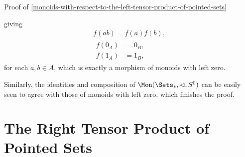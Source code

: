 \begin{Proof}{Proof of \cref{monoids-with-respect-to-the-left-tensor-product-of-pointed-sets}}
\begin{webcompile}
    \end{webcompile}
    giving
    \begin{gather*}
        f(ab)    = f(a)f(b),\\
        \begin{aligned}
            f(0_{A}) &= 0_{B},\\
            f(1_{A}) &= 1_{B},
        \end{aligned}
    \end{gather*}
    for each $a,b\in A$, which is exactly a morphism of monoids with left zero.

    Similarly, the identities and composition of $\Mon(\Sets_{*},\lhd,S^{0})$ can be easily seen to agree with those of monoids with left zero, which finishes the proof.
\end{Proof}
\section{The Right Tensor Product of Pointed Sets}\label{section-the-right-tensor-product-of-pointed-sets}
